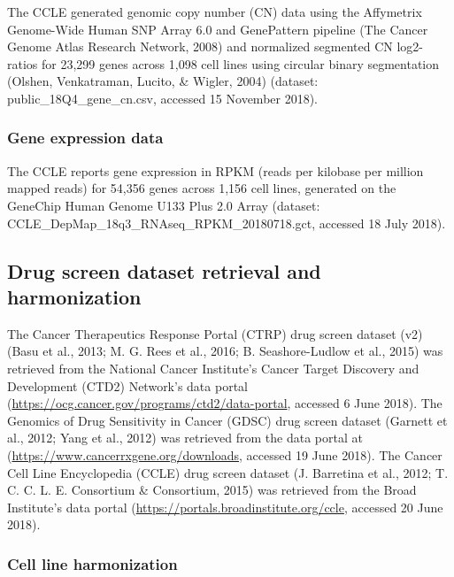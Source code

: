 \documentclass[man]{apa6}
\begin{document}
The CCLE generated genomic copy number (CN) data using the Affymetrix
Genome-Wide Human SNP Array 6.0 and GenePattern pipeline (The Cancer
Genome Atlas Research Network, 2008) and normalized segmented CN
log2-ratios for 23,299 genes across 1,098 cell lines using circular
binary segmentation (Olshen, Venkatraman, Lucito, \& Wigler, 2004)
(dataset: public\_18Q4\_gene\_cn.csv, accessed 15 November 2018).

\subsubsection{Gene expression data}\label{gene-expression-data}

The CCLE reports gene expression in RPKM (reads per kilobase per million
mapped reads) for 54,356 genes across 1,156 cell lines, generated on the
GeneChip Human Genome U133 Plus 2.0 Array (dataset:
CCLE\_DepMap\_18q3\_RNAseq\_RPKM\_20180718.gct, accessed 18 July 2018).

\subsection{Drug screen dataset retrieval and
harmonization}\label{drug-screen-dataset-retrieval-and-harmonization}

The Cancer Therapeutics Response Portal (CTRP) drug screen dataset (v2)
(Basu et al., 2013; M. G. Rees et al., 2016; B. Seashore-Ludlow et al.,
2015) was retrieved from the National Cancer Institute's Cancer Target
Discovery and Development (CTD2) Network's data portal
(\url{https://ocg.cancer.gov/programs/ctd2/data-portal}, accessed 6 June
2018). The Genomics of Drug Sensitivity in Cancer (GDSC) drug screen
dataset (Garnett et al., 2012; Yang et al., 2012) was retrieved from the
data portal at (\url{https://www.cancerrxgene.org/downloads}, accessed
19 June 2018). The Cancer Cell Line Encyclopedia (CCLE) drug screen
dataset (J. Barretina et al., 2012; T. C. C. L. E. Consortium \&
Consortium, 2015) was retrieved from the Broad Institute's data portal
(\url{https://portals.broadinstitute.org/ccle}, accessed 20 June 2018).

\subsubsection{Cell line harmonization}\label{cell-line-harmonization}
\end{document}

